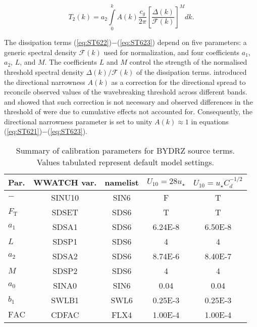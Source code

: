 \begin{equation}\label{eq:ST623}
T_2(k)=a_2 \int\limits_0^k A(k) \frac{c_g}{2\pi} \left [ \frac{\Delta(k)}{\mathcal{F}(k)} \right ]^M\!\!dk.
\end{equation}

The dissipation terms (\ref{eq:ST622})$-$(\ref{eq:ST623}) depend on five 
parameters: a generic spectral density $\mathcal{F}(k)$ used for 
normalization, and four coefficients $a_1$, $a_2$, $L$, and $M$. 
The coefficients $L$ and $M$ control the strength 
of the normalised threshold spectral density $\Delta(k)/\mathcal{F}(k)$ 
of the dissipation terms. \citet{art:BGM02} introduced the 
directional narrowness $A(k)$ as a correction for the directional 
spread to reconcile observed values of the wavebreaking 
threshold across different bands. \citet{art:BBYD07} 
and \citet{art:B09} showed that such correction is not necessary 
and observed differences in the threshold of \citet{art:BGM02} 
were due to cumulative effects not accounted for. Consequently, 
the directional narrowness parameter is set to unity 
$A(k)\approx 1$ in equations (\ref{eq:ST621})$-$(\ref{eq:ST623}).

\begin{table} \begin{center}
\begin{tabular}{|l|c|c|c|c|} \hline \hline
Par.         &  WWATCH var. & namelist & $U_{10}=28u_\star$ & $U_{10}=u_\star C^{-1/2}_{d}$  \\
\hline
  $-$              &  SINU10      & SIN6     &  F      &   T           \\
  $F_{\mathrm{T}}$ &  SDSET       & SDS6     &  T      &   T            \\
  $a_1$            &  SDSA1       & SDS6     & 6.24E-8 &   6.50E-8      \\
  $L$              &  SDSP1       & SDS6     &  4      &   4            \\
  $a_2$            &  SDSA2       & SDS6     & 8.74E-6 &   8.40E-7      \\
  $M$              &  SDSP2       & SDS6     &  4      &   4            \\
\hline
  $a_0$            &  SINA0       & SIN6     & 0.04    &   0.04         \\
  $b_1$            &  SWLB1       & SWL6     & 0.25E-3 &   0.25E-3      \\
  $\mathrm{FAC}$   &  CDFAC       & FLX4     & 1.00E-4 &   1.00E-4      \\
 \hline \hline
\end{tabular} \end{center}
\caption{Summary of calibration parameters for BYDRZ source terms.
         Values tabulated represent default model settings.}
\label{tab:ST601} \botline \end{table}

